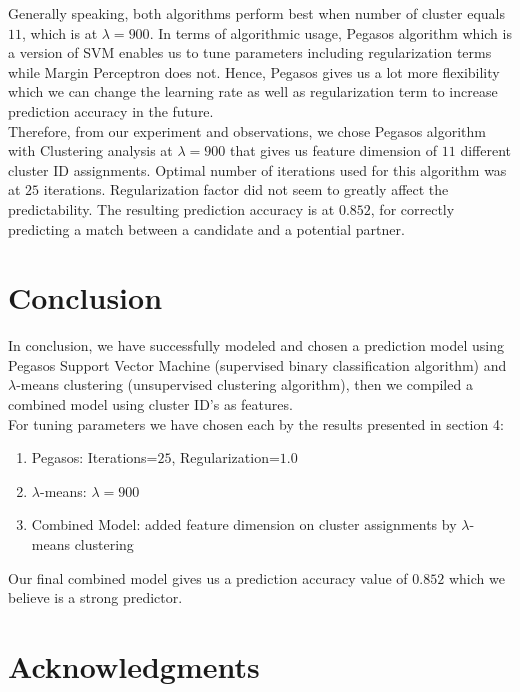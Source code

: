 \documentclass[11pt,letterpaper]{article}
\begin{document}
\begin{enumerate}
Generally speaking, both algorithms perform best when number of cluster equals $11$, which is at $\lambda=900$. In terms of algorithmic usage, Pegasos algorithm which is a version of SVM enables us to tune parameters including regularization terms while Margin Perceptron does not. Hence, Pegasos gives us a lot more flexibility which we can change the learning rate as well as regularization term to increase prediction accuracy in the future.\\

Therefore, from our experiment and observations, we chose Pegasos algorithm with Clustering analysis at $\lambda = 900$ that gives us feature dimension of $11$ different cluster ID assignments. Optimal number of iterations used for this algorithm was at $25$ iterations. Regularization factor did not seem to greatly affect the predictability. The resulting prediction accuracy is at $0.852$, for correctly predicting a match between a candidate and a potential partner.

\end{enumerate}

\section{Conclusion}

In conclusion, we have successfully modeled and chosen a prediction model using Pegasos Support Vector Machine (supervised binary classification algorithm) and $\lambda$-means clustering (unsupervised clustering algorithm), then we compiled a combined model using cluster ID's as features.\\

For tuning parameters we have chosen each by the results presented in section 4:

\begin{enumerate}
\item Pegasos: Iterations=$25$, Regularization=$1.0$
\item $\lambda$-means: $\lambda=900$
\item Combined Model: added feature dimension on cluster assignments by $\lambda$-means clustering
\end{enumerate}

Our final combined model gives us a prediction accuracy value of $0.852$ which we believe is a strong predictor.

\section*{Acknowledgments}
\end{document}
